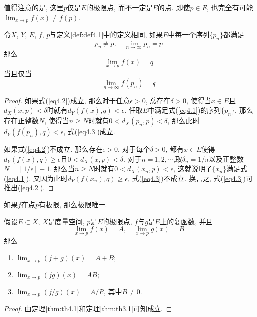 \documentclass[cn,12pt,math=mtpro2,citestyle=gb7714-2015,bibstyle=gb7714-2015,twocol]{elegantbook}
\newcommand{\limn }{\lim_{n\to\infty}}
\begin{document}
值得注意的是, 这里$p$仅是$E$的极限点, 而不一定是$E$的点. 即使$p\in E$, 也完全有可能$\lim_{x\to p}f(x)\neq f(p)$.
\begin{theorem}\label{thm:th4.1}
  令$X$, $Y$, $E$, $f$, $p$与定义\ref{def:def4.1}中的定义相同, 如果$E$中每一个序列$\{p_n\}$都满足
  \begin{equation}\label{eq4.1}
    p_n\neq p,\quad \limn p_n=p
  \end{equation}
  那么
  \begin{equation}\label{eq4.2}
    \displaystyle \lim_{x\to p}f(x)=q
  \end{equation}
  当且仅当
  \begin{equation}\label{eq4.3}
    \displaystyle\limn f(p_n)=q
  \end{equation}
\end{theorem}
\begin{proof}
  如果式(\ref{eq4.2})成立, 那么对于任意$\epsilon>0$, 总存在$\delta>0$, 使得当$x\in E$且$d_X(x,p)<\delta$时就有$d_Y(f(x),q)<\epsilon$. 任取$E$中满足式(\ref{eq4.1})的序列$\{p_n\}$, 那么存在正整数$N$, 使得当$n\geq N$时就有$0<d_X(p_n,p)<\delta$, 那么此时$d_Y(f(p_n),q)<\epsilon$, 式(\ref{eq4.3})成立.

  如果式(\ref{eq4.2})不成立. 那么存在$\epsilon>0$, 对于每个$\delta>0$, 都有$x\in E$使得$d_Y(f(x),q)\geq\epsilon$且$0<d_X(x,p)<\delta$. 对于$n=1,2,\cdots$,取$\displaystyle\delta_n=1/n$以及正整数$N=\displaystyle\left\lfloor1/\epsilon\right\rfloor+1$, 那么当$n\geq N$时就有$0<d_X(x_n,p)<\epsilon$, 这就说明了$\{x_n\}$满足式(\ref{eq4.1}), 又因为此时$d_Y(f(x_n),q)\geq\epsilon$, 式(\ref{eq4.3})不成立. 换言之, 式(\ref{eq4.3})可推出(\ref{eq4.2}).

\end{proof}
\begin{corollary}
如果$f$在点$p$有极限, 那么极限唯一.
\end{corollary}
\begin{theorem}\label{thm:th4.3}
  假设$E\subset X$, $X$是度量空间, $p$是$E$的极限点, $f$与$g$是$E$上的复函数, 并且
  $$\lim_{x\to p}f(x)=A,\quad\lim_{x\to p}g(x)=B$$
  那么
  \begin{enumerate}[label=(\arabic*)]
  \item $\lim_{x\to p}(f+g)(x)=A+B$;

  \item $\lim_{x\to p}(fg)(x)=AB$;

  \item $\lim_{x\to p}(f/g)(x)=A/B$, 其中$B\neq 0$.
  \end{enumerate}
\end{theorem}
\begin{proof}
  由定理\ref{thm:th4.1}和定理\ref{thm:th3.1}可知成立.
\end{proof}
\end{document}
